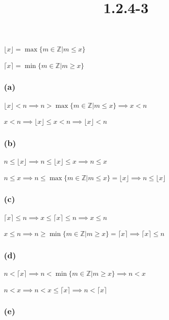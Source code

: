 \documentclass{article}
\title{1.2.4-3}
\begin{document}
\maketitle

\( \lfloor x \rfloor = \max \{ m \in \mathbb{Z} | m \leq x \} \)

\( \lceil x \rceil = \min \{ m \in \mathbb{Z} | m \geq x \} \)

\subsubsection*{(a)}

\( \lfloor x \rfloor < n \implies n > \max \{ m \in \mathbb{Z} | m \leq x \}  \implies x < n \)

\( x < n \implies \lfloor x \rfloor \leq x < n \implies \lfloor x \rfloor < n \)

\subsubsection*{(b)}

\( n \leq \lfloor x \rfloor \implies n \leq \lfloor x \rfloor \leq x \implies n \leq x \)

\( n \leq x \implies n \leq \max \{ m \in \mathbb{Z} | m \leq x \} = \lfloor x \rfloor \implies n \leq \lfloor x \rfloor \)

\subsubsection*{(c)}

\( \lceil x \rceil \leq n \implies x \leq \lceil x \rceil \leq n \implies x \leq n \)

\( x \leq n \implies n \geq \min \{ m \in \mathbb{Z} | m \geq x \} = \lceil x \rceil \implies \lceil x \rceil \leq n \)

\subsubsection*{(d)}

\( n < \lceil x \rceil \implies n < \min \{ m \in \mathbb{Z} | m \geq x \} \implies n < x \)

\( n < x \implies n < x \leq \lceil x \rceil \implies n < \lceil x \rceil \)

\subsubsection*{(e)}
\end{document}
